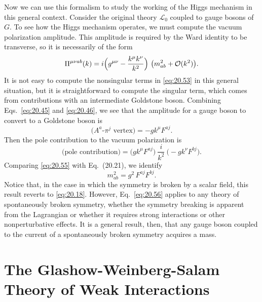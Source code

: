 Now we can use this formalism to study the working of the Higgs mechanism in
this general context.  Consider the original theory $\mathcal{L}_0$ coupled to
gauge bosons of $G$.  To see how the Higgs mechanism operates, we must
compute the vacuum polarization amplitude.  This amplitude is required by the
Ward identity to be transverse, so it is necessarily of the form
\begin{equation}
  \Pi^{\mu\nu ab}(k) = i\Bigl( g^{\mu\nu} - \frac{k^\mu k^\nu}{k^2}
    \Bigr)\ \bigl( m^2_{ab} + \mathcal{O}(k^2) \bigr) .
  \label{eq:20.53}
\end{equation}
It is not easy to compute the nonsingular terms in \eqref{eq:20.53} in this
general situation, but it is straightforward to compute the singular term,
which comes from contributions with an intermediate Goldstone boson.
Combining Eqs.~\eqref{eq:20.45} and \eqref{eq:20.46}, we see that the
amplitude for a gauge boson to convert to a Goldstone boson is
\begin{equation}
  \text{($A^a$-$\pi^j$ vertex)} = -g k^\mu F^{aj} .
  \label{eq:20.54}
\end{equation}
Then the pole contribution to the vacuum polarization is
\begin{equation}
  \text{(pole contribution)} = \bigl( gk^\mu F^{aj} \bigr)\
    \frac{i}{k^2}\ \bigl( -gk^\nu F^{bj} \bigr) .
  \label{eq:20.55}
\end{equation}
Comparing \eqref{eq:20.55} with Eq.~(20.21), we identify
\begin{equation}
  m^2_{ab} = g^2\,F^{aj}F^{bj} .
  \label{eq:20.56}
\end{equation}
Notice that, in the case in which the symmetry is broken by a scalar field,
this result reverts to \eqref{eq:20.18}.  However, Eq.~\eqref{eq:20.56}
applies to any theory of spontaneously broken symmetry, whether the symmetry
breaking is apparent from the Lagrangian or whether it requires strong
interactions or other nonperturbative effects.  It is a general result, then,
that any gauge boson coupled to the current of a spontaneously broken
symmetry acquires a mass.

\section{The Glashow-Weinberg-Salam Theory of Weak Interactions}


